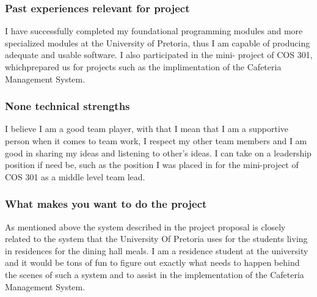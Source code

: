 \documentclass[hidelinks, 12pt, oneside]{article}
\begin{document}
\subsubsection{Past experiences relevant for project}
I have successfully completed my foundational programming modules and
more specialized modules at the University of Pretoria, thus I am capable
of producing adequate and usable software. I also participated in the mini-
project of COS 301, whichprepared us for projects such as the implimentation of 
the Cafeteria Management System. 

\subsubsection{None technical strengths}
I believe I am a good team player, with that I mean that I am a supportive
person when it comes to team work, I respect my other team members and
I am good in sharing my ideas and listening to other's ideas. I can take on
a leadership position if need be, such as the position I was placed in for the
mini-project of COS 301 as a middle level team lead.

\subsubsection{What makes you want to do the project}
As  mentioned above the system described in the project proposal is closely related to the system that the University Of Pretoria uses for the students living in residences for the dining hall meals. I am a residence student at the university and it would be tons of fun to figure out exactly what needs to happen behind the scenes of such a system and to assist in the implementation of the Cafeteria Management System. 
\end{document}
